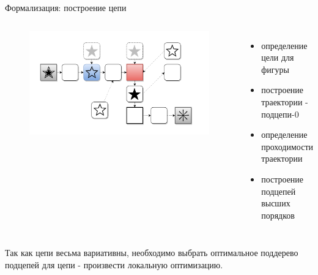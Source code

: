 \begin{frame}{Формализация: построение цепи}
\begin{columns}
\begin{figure}
\includegraphics[scale=0.2]{./pictures/chain.png}
\end{figure}
\begin{itemize}
\item определение цели для фигуры
\item построение траектории - подцепи-0
\item определение проходимости траектории
\item построение подцепей высших порядков
\end{itemize}
\end{columns}
Так как цепи весьма вариативны, необходимо выбрать оптимальное поддерево подцепей для цепи - произвести локальную оптимизацию.
\end{frame}

